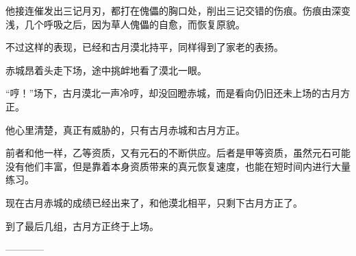 \begin{this_body}
他接连催发出三记月刃，都打在傀儡的胸口处，削出三记交错的伤痕。伤痕由深变浅，几个呼吸之后，因为草人傀儡的自愈，而恢复原貌。

不过这样的表现，已经和古月漠北持平，同样得到了家老的表扬。

赤城昂着头走下场，途中挑衅地看了漠北一眼。

“哼！”场下，古月漠北一声冷哼，却没回瞪赤城，而是看向仍旧还未上场的古月方正。

他心里清楚，真正有威胁的，只有古月赤城和古月方正。

前者和他一样，乙等资质，又有元石的不断供应。后者是甲等资质，虽然元石可能没有他们丰富，但是靠着本身资质带来的真元恢复速度，也能在短时间内进行大量练习。

现在古月赤城的成绩已经出来了，和他漠北相平，只剩下古月方正了。

到了最后几组，古月方正终于上场。

------------

\end{this_body}

